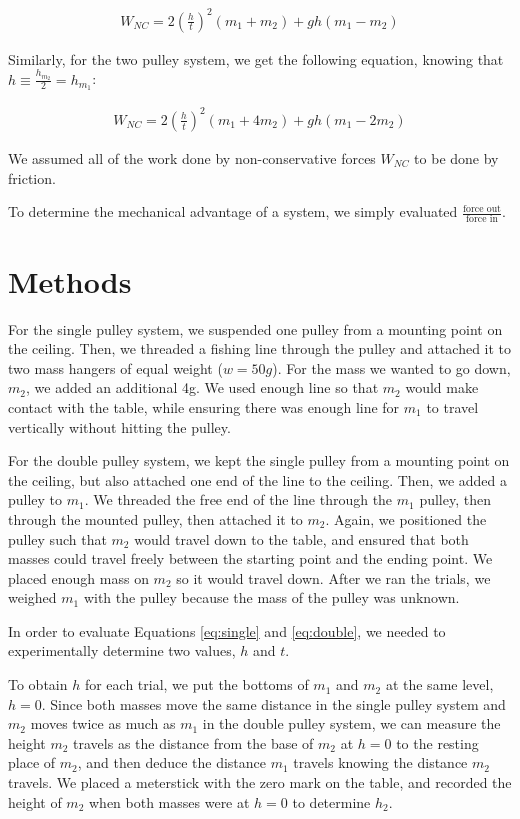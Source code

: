 \documentclass[12pt]{article}
\begin{document}
\begin{align}\label{eq:single}
W_{NC} = 2 \left( \frac{h}{t} \right)^2 (m_1 + m_2) + g h (m_1 - m_2)
\end{align}

Similarly, for the two pulley system, we get the following equation, knowing that \(h \equiv \frac{h_{m_2}}{2} = h_{m_1}\):

\begin{align}\label{eq:double}
W_{NC} = 2 \left( \frac{h}{t} \right)^2 (m_1 + 4 m_2) + g h (m_1 - 2 m_2)
\end{align}

We assumed all of the work done by non-conservative forces \(W_{NC}\) to be done by friction.

To determine the mechanical advantage of a system, we simply evaluated \(\frac{\text{force out}}{\text{force in}}\).
\section{Methods}
\label{sec:orge87fa25}

For the single pulley system, we suspended one pulley from a mounting point on the ceiling. Then, we threaded a fishing line through the pulley and attached it to two mass hangers of equal weight (\(w = 50g\)). For the mass we wanted to go down, \(m_2\), we added an additional 4g. We used enough line so that \(m_2\) would make contact with the table, while ensuring there was enough line for \(m_1\) to travel vertically without hitting the pulley.

For the double pulley system, we kept the single pulley from a mounting point on the ceiling, but also attached one end of the line to the ceiling. Then, we added a pulley to \(m_1\). We threaded the free end of the line through the \(m_1\) pulley, then through the mounted pulley, then attached it to \(m_2\). Again, we positioned the pulley such that \(m_2\) would travel down to the table, and ensured that both masses could travel freely between the starting point and the ending point. We placed enough mass on \(m_2\) so it would travel down. After we ran the trials, we weighed \(m_1\) with the pulley because the mass of the pulley was unknown.

In order to evaluate Equations \ref{eq:single} and \ref{eq:double}, we needed to experimentally determine two values, \(h\) and \(t\).

To obtain \(h\) for each trial, we put the bottoms of \(m_1\) and \(m_2\) at the same level, \(h = 0\). Since both masses move the same distance in the single pulley system and \(m_2\) moves twice as much as \(m_1\) in the double pulley system, we can measure the height \(m_2\) travels as the distance from the base of \(m_2\) at \(h = 0\) to the resting place of \(m_2\), and then deduce the distance \(m_1\) travels knowing the distance \(m_2\) travels. We placed a meterstick with the zero mark on the table, and recorded the height of \(m_2\) when both masses were at \(h = 0\) to determine \(h_2\).
\end{document}
